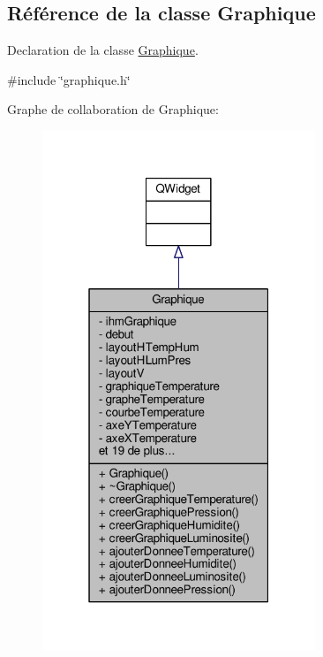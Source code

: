 \hypertarget{class_graphique}{}\subsection{Référence de la classe Graphique}
\label{class_graphique}


Declaration de la classe \hyperlink{class_graphique}{Graphique}.  




{\ttfamily \#include \char`\"{}graphique.\+h\char`\"{}}



Graphe de collaboration de Graphique\+:
\nopagebreak
\begin{figure}[H]
\begin{center}
\leavevmode
\includegraphics[width=232pt]{class_graphique__coll__graph}
\end{center}
\end{figure}
